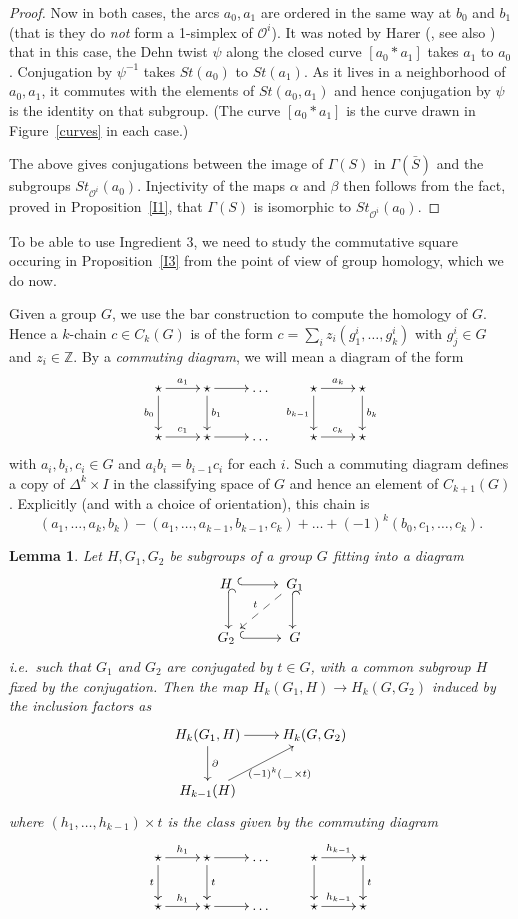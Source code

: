 \documentclass[10pt]{amsart}
\newtheorem{lem}[thm]{Lemma}
\newcommand{\OO}{\mathcal{O}}
\newcommand{\Z}{\mathbb{Z}}
\newcommand{\al}{\alpha}
\newcommand{\Ga}{\Gamma}
\newcommand{\rar}{\longrightarrow}
\newcommand{\x}{\times}
\newcommand{\del}{\partial}
\begin{document}
\begin{proof}
Now in both cases, the arcs $a_0,a_1$ are ordered in the same way at $b_0$ and $b_1$ (that is they do {\em not} form a 1-simplex of
$\OO^i$). It was noted by Harer (\cite{Har93}, see also \cite[Prop. 3.2]{Bol09}) that in this case, the Dehn twist $\psi$ 
along the closed curve $[a_0*a_1]$ takes $a_1$ to $a_0$. Conjugation by $\psi^{-1}$ takes $St(a_0)$ to $St(a_1)$.  
As it lives in a neighborhood of $a_0,a_1$, it commutes with the elements of $St(a_0,a_1)$ and
hence conjugation by $\psi$ is the identity on that subgroup.  (The curve
$[a_0*a_1]$ is the curve drawn in Figure~\ref{curves} in each case.)

The above gives conjugations between the image of $\Ga(S)$ in $\Ga(\bar S)$ and the subgroups $St_{\OO^i}(a_0)$. Injectivity of the
maps $\al$ and $\beta$ then follows from the fact, proved in Proposition~\ref{I1}, that 
 $\Ga(S)$ is isomorphic to $St_{\OO^i}(a_0)$. 
\end{proof}


To be able to use Ingredient 3, we need to study the commutative square
occuring in Proposition~\ref{I3} from the point of view of group homology,
which we do now. 

\smallskip

Given a group $G$, we use the bar construction to compute the homology of
$G$. Hence a $k$-chain $c\in C_k(G)$ is of the form
$c=\sum_iz_i(g^i_1,\dots,g^i_k)$ with $g^i_j\in G$ and $z_i\in \Z$. By a {\em commuting diagram}, we will mean a diagram of
the form 
$$\xymatrix{\star \ar[r]^{a_1}\ar[d]_{b_0}&\star\ar[r]\ar[d]^{b_1} &\dots &
  \star\ar[r]^{a_k} \ar[d]_{b_{k-1}}&\star\ar[d]^{b_k}\\
 \star \ar[r]^{c_1}&\star\ar[r] &\dots &\star\ar[r]^{c_k}&\star}$$
 with $a_i,b_i,c_i\in G$ and $a_ib_i=b_{i-1}c_i$ for each $i$. 
Such a commuting diagram defines a copy of $\Delta^k\times I$ in the
classifying space of $G$ and hence an element of $C_{k+1}(G)$. Explicitly (and
with a choice of orientation), this chain is 
$$(a_1,\dots,a_k,b_k)-
(a_1,\dots,a_{k-1},b_{k-1},c_k)+\dots+(-1)^k(b_0,c_1,\dots,c_k).$$ 


\begin{lem}\label{relative}
Let $H,G_1,G_2$ be subgroups of a group $G$ 
fitting into a diagram
$$\xymatrix{H\ \ar@{^(->}[r]\ar@{^(->}[d] & \ G_1\ar@{^(->}[d]\ar@{-->}_t[dl]\\
G_2\ \ar@{^(->}[r] & \ G}$$
i.e.~such that $G_1$ and $G_2$ are conjugated by $t\in G$, with a common subgroup $H$
fixed by the conjugation. Then the map
$H_k(G_1,H)\rar H_k(G,G_2)$ induced by the inclusion factors as
$$\xymatrix{H_k(G_1,H) \ar[r]\ar[d]^\del &
  H_k(G,G_2)\\
H_{k-1}(H)\ar[ur]_{(-1)^k(\,\_\,\x t)}}$$
where $(h_1,\dots,h_{k-1}) \x t$ is the class given by the
commuting diagram
$$\xymatrix{\star \ar[r]^{h_1}\ar[d]_{t} & \star\ar[d]^{t}\ar[r] & \dots & \star \ar[d]\ar[r]^{h_{k-1}} &
  \star \ar[d]^{t}\\
\star \ar[r]^{h_1} & \star\ar[r] & \dots & \star \ar[r]^{h_{k-1}} & \star}$$
\end{lem}
\end{document}
